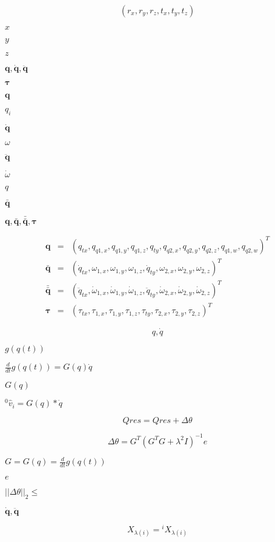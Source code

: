 \documentclass{article}
\begin{document}
\[ (r_x, r_y, r_z, t_x, t_y, t_z) \]
\pagebreak

$x$
\pagebreak

$y$
\pagebreak

$z$
\pagebreak

$\mathbf{q}, \mathbf{\dot{q}}, \mathbf{\ddot{q}}$
\pagebreak

$\mathbf{\tau}$
\pagebreak

$\mathbf{q}$
\pagebreak

$q_i$
\pagebreak

$\mathbf{\dot{q}}$
\pagebreak

$\omega$
\pagebreak

$\mathbf{\ddot{q}}$
\pagebreak

$\dot{\omega}$
\pagebreak

$q$
\pagebreak

$\mathbf{\bar{q}}$
\pagebreak

$\mathbf{q},\mathbf{\bar{q}},\mathbf{\bar{\bar{q}}},\mathbf{\tau}$
\pagebreak

\begin{eqnarray*} \mathbf{q} &=& ( q_{tx}, q_{q1,x}, q_{q1,y}, q_{q1,z}, q_{ty}, q_{q2,x}, q_{q2,y}, q_{q2,z}, q_{q1,w}, q_{q2,w})^T \\ \mathbf{\bar{q}} &=& ( \dot{q}_{tx}, \omega_{1,x}, \omega_{1,y}, \omega_{1,z}, \dot{q}_{ty}, \omega_{2,x}, \omega_{2,y}, \omega_{2,z} )^T \\ \mathbf{\bar{\bar{q}}} &=& ( \ddot{q}_{tx}, \dot{\omega}_{1,x}, \dot{\omega}_{1,y}, \dot{\omega}_{1,z}, \ddot{q}_{ty}, \dot{\omega}_{2,x}, \dot{\omega}_{2,y}, \dot{\omega}_{2,z} )^T \\ \mathbf{\tau} &=& ( \tau_{tx}, \tau_{1,x}, \tau_{1,y}, \tau_{1,z}, \tau_{ty}, \tau_{2,x}, \tau_{2,y}, \tau_{2,z} )^T \end{eqnarray*}
\pagebreak

\[ q, \dot{q} \]
\pagebreak

$g(q(t))$
\pagebreak

$\frac{d}{dt} g(q(t)) = G(q)\dot{q}$
\pagebreak

$G(q)$
\pagebreak

${}^0 \hat{v}_i = G(q) * \dot{q}$
\pagebreak

\[ Qres = Qres + \Delta \theta\]
\pagebreak

\[ \Delta \theta = G^T (G^T G + \lambda^2 I)^{-1} e \]
\pagebreak

$G = G(q) = \frac{d}{dt} g(q(t))$
\pagebreak

$e$
\pagebreak

$||\Delta \theta||_2 \le$
\pagebreak

$\mathbf{\dot{q}}, \mathbf{\ddot{q}}$
\pagebreak

\[ X_{\lambda(i)} = {}^{i} X_{\lambda(i)} \]
\pagebreak
\end{document}

